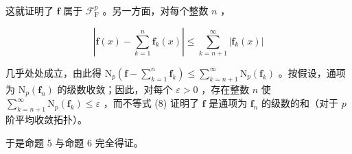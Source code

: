 这就证明了 \(\mathbf{f}\) 属于 \(\mathcal{F}_{\mathrm{F}}^{p}\) 。另一方面，对每个整数 \(n\) ，

\[
\left| \mathbf {f} (x) - \sum_ {k = 1} ^ {n} \mathbf {f} _ {k} (x) \right| \leqslant \sum_ {k = n + 1} ^ {\infty} | \mathbf {f} _ {k} (x) |
\]

几乎处处成立，由此得 \(\mathrm{N}_{p}\left(\mathbf{f}-\sum_{k=1}^{n}\mathbf{f}_{k}\right)\leqslant\sum_{k=n+1}^{\infty}\mathrm{N}_{p}(\mathbf{f}_{k})\) 。按假设，通项为 \(\mathrm{N}_{p}(\mathbf{f}_{n})\) 的级数收敛；因此，对每个 \(\varepsilon > 0\) ，存在整数 \(n\) 使 \(\sum_{k=n+1}^{\infty} \mathrm{N}_{p}(\mathbf{f}_{k}) \leqslant \varepsilon\) ，而不等式 (8) 证明了 \(\mathbf{f}\) 是通项为 \(\mathbf{f}_{n}\) 的级数的和（对于 \(p\) 阶平均收敛拓扑）。

于是命题 5 与命题 6 完全得证。

